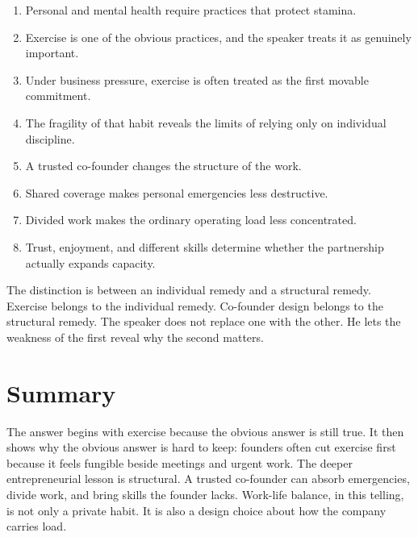 \begin{enumerate}
\item Personal and mental health require practices that protect stamina.
\item Exercise is one of the obvious practices, and the speaker treats it as genuinely important.
\item Under business pressure, exercise is often treated as the first movable commitment.
\item The fragility of that habit reveals the limits of relying only on individual discipline.
\item A trusted co-founder changes the structure of the work.
\item Shared coverage makes personal emergencies less destructive.
\item Divided work makes the ordinary operating load less concentrated.
\item Trust, enjoyment, and different skills determine whether the partnership actually expands capacity.
\end{enumerate}

The distinction is between an individual remedy and a structural remedy. Exercise belongs to the individual remedy. Co-founder design belongs to the structural remedy. The speaker does not replace one with the other. He lets the weakness of the first reveal why the second matters.

\section{Summary}

The answer begins with exercise because the obvious answer is still true. It then shows why the obvious answer is hard to keep: founders often cut exercise first because it feels fungible beside meetings and urgent work. The deeper entrepreneurial lesson is structural. A trusted co-founder can absorb emergencies, divide work, and bring skills the founder lacks. Work-life balance, in this telling, is not only a private habit. It is also a design choice about how the company carries load.